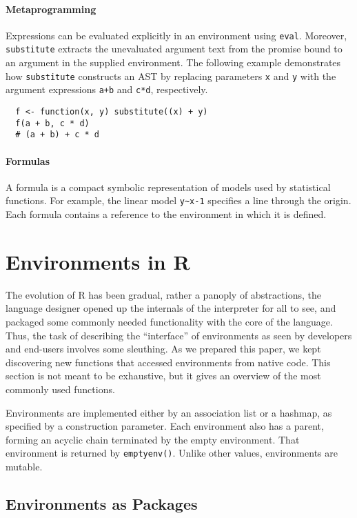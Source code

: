 \documentclass[10pt,sigplan,authorversion=true]{acmart}
\renewcommand{\c}[1]{\lstinline |#1|\xspace}
\newcommand{\eval}{\c{eval}}
\newcommand{\substitute}{\c{substitute}}
\begin{document}
\paragraph{Metaprogramming}

Expressions can be evaluated explicitly in an
environment using \eval. Moreover, \substitute extracts the unevaluated argument
text from the promise bound to an argument in the supplied environment. The
following example demonstrates how \substitute constructs an AST by replacing
parameters \c{x} and \c{y} with the argument expressions \c{a+b} and \c{c*d},
respectively.


\begin{lstlisting}
  f <- function(x, y) substitute((x) + y)
  f(a + b, c * d)
  # (a + b) + c * d
\end{lstlisting}


\paragraph{Formulas}  A formula is a compact symbolic representation of models
used by statistical functions. For example, the linear model \c{y~x-1}
specifies a line through the origin. Each formula contains a reference to the
environment in which it is defined.

\newpage
\section{Environments in R}

The evolution of R has been gradual, rather a panoply of abstractions, the
language designer opened up the internals of the interpreter for all to see, and
packaged some commonly needed functionality with the core of the language. Thus,
the task of describing the ``interface'' of environments as seen by developers
and end-users involves some sleuthing. As we prepared this paper, we kept
discovering new functions that accessed environments from native code. This
section is not meant to be exhaustive, but it gives an overview of the most
commonly used functions.

Environments are implemented either by an association list or a hashmap, as
specified by a construction parameter. Each environment also has a parent,
forming an acyclic chain terminated by the empty environment. That environment
is returned by \c{emptyenv()}. Unlike other values, environments are mutable.

\subsection{Environments as Packages}
\end{document}
